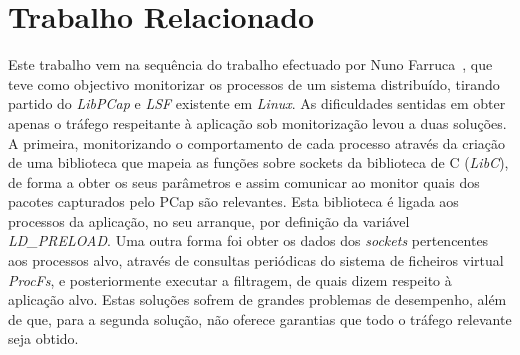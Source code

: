 \documentclass[a4paper]{llncs}
\providecommand{\e}[1]{\ensuremath{\times 10^{#1}}}
\begin{document}
%
%
%

\section{Trabalho Relacionado}
\label{sec:related_work}


Este trabalho vem na sequência do trabalho efectuado por Nuno Farruca~\cite{Farruca:2009,duarte10}, que teve como objectivo monitorizar os processos de um sistema distribuído, tirando partido do \textit{LibPCap} e \textit{LSF} existente em \textit{Linux}.
 As dificuldades sentidas em obter apenas o tráfego respeitante à aplicação sob monitorização levou a duas soluções.
 A primeira, monitorizando o comportamento de cada processo através da criação de uma biblioteca que mapeia as funções sobre sockets da biblioteca de C (\textit{LibC}), de forma a obter os seus parâmetros e assim comunicar ao monitor quais dos pacotes capturados pelo PCap são relevantes.
 Esta biblioteca é ligada aos processos da aplicação, no seu arranque, por definição da variável \textit{LD\_PRELOAD}.
 Uma outra forma foi obter os dados dos \textit{sockets} pertencentes aos processos alvo, através de consultas periódicas do sistema de ficheiros virtual \textit{ProcFs}, e posteriormente executar a filtragem, de quais dizem respeito à aplicação alvo.
 Estas soluções sofrem de grandes problemas de desempenho, além de que, para a segunda solução, não oferece garantias que todo o tráfego relevante seja obtido.
\end{document}
